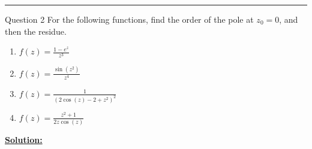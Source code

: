 \documentclass{article}
\begin{document}
\vskip 0.5cm
\hrule 
\vskip 0.5cm



\begin{mathdefinitionbox}{Question 2}
\vskip 0.5cm
For the following functions, find the order of the pole at $z_0 = 0$, and then the residue.
\begin{enumerate}[label=(\alph*)]
  \item $f(z) = \frac{1-e^{z}}{z^3}$
  \item $f(z) = \frac{\sin(z^2)}{z^4}$ 
  \item $f(z) = \frac{1}{\left(2\cos(z)-2+z^2\right)^2}$
  \item $f(z) = \frac{z^2 + 1}{2z \cos(z) }$
\end{enumerate}
\end{mathdefinitionbox}

\vskip 0.5cm
\underline{\textbf{Solution:}}
\end{document}
